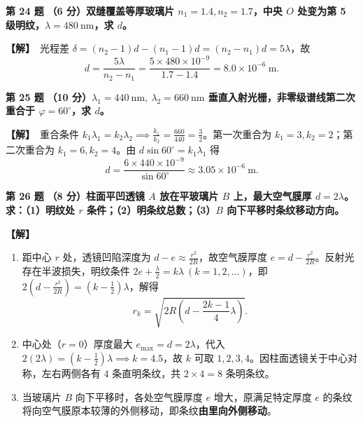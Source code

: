 \documentclass[zihao=5,a4paper,UTF8]{ctexart}
\newenvironment{prob}[2]{%
    \par\vspace{5pt}\noindent\textbf{\color{navy}#1} \textbf{#2}\par\nopagebreak\vspace{2pt}%
}{%
    \par\vspace{3pt}%
}
\newcommand{\sol}{\noindent\textbf{\color{tealaccent}【解】}\ }
\begin{document}
\begin{prob}{第 24 题}{（6 分）双缝覆盖等厚玻璃片 $n_1=1.4, n_2=1.7$，中央 $O$ 处变为第 5 级明纹，$\lambda=480\ \mathrm{nm}$，求 $d$。}
\sol 光程差 $\delta = (n_2 - 1)d - (n_1 - 1)d = (n_2 - n_1)d = 5\lambda$，故
\[
    d = \frac{5\lambda}{n_2 - n_1} = \frac{5\times 480\times 10^{-9}}{1.7 - 1.4} = 8.0\times 10^{-6}\ \mathrm{m}.
\]
\end{prob}

\begin{prob}{第 25 题}{（10 分）$\lambda_1=440\ \mathrm{nm},\ \lambda_2=660\ \mathrm{nm}$ 垂直入射光栅，非零级谱线第二次重合于 $\varphi=60^\circ$，求 $d$。}
\sol 重合条件 $k_1\lambda_1 = k_2\lambda_2 \implies \frac{k_1}{k_2} = \frac{660}{440} = \frac{3}{2}$。第一次重合为 $k_1=3, k_2=2$；第二次重合为 $k_1=6, k_2=4$。由 $d\sin 60^\circ = k_1\lambda_1$ 得
\[
    d = \frac{6\times 440\times 10^{-9}}{\sin 60^\circ} \approx 3.05\times 10^{-6}\ \mathrm{m}.
\]
\end{prob}

\begin{prob}{第 26 题}{（8 分）柱面平凹透镜 $A$ 放在平玻璃片 $B$ 上，最大空气膜厚 $d = 2\lambda$。求：（1）明纹处 $r$ 条件；（2）明条纹总数；（3）$B$ 向下平移时条纹移动方向。}
\sol
\begin{enumerate}[leftmargin=2em, itemsep=2pt]
    \item 距中心 $r$ 处，透镜凹陷深度为 $d - e \approx \frac{r^2}{2R}$，故空气膜厚度 $e = d - \frac{r^2}{2R}$。反射光存在半波损失，明纹条件 $2e + \frac{\lambda}{2} = k\lambda\ (k=1,2,\dots)$，即 $2\left(d - \frac{r^2}{2R}\right) = \left(k - \frac{1}{2}\right)\lambda$，解得
    \[
        r_k = \sqrt{2R\left(d - \frac{2k-1}{4}\lambda\right)}.
    \]
    \item 中心处（$r=0$）厚度最大 $e_{\max} = d = 2\lambda$，代入 $2(2\lambda) = (k - \frac{1}{2})\lambda \implies k = 4.5$，故 $k$ 可取 $1, 2, 3, 4$。因柱面透镜关于中心对称，左右两侧各有 $4$ 条直明条纹，共 $2\times 4 = 8$ 条明条纹。
    \item 当玻璃片 $B$ 向下平移时，各处空气膜厚度 $e$ 增大，原满足特定厚度 $e$ 的条纹将向空气膜原本较薄的外侧移动，即条纹\textbf{由里向外侧移动}。
\end{enumerate}
\end{prob}

\end{document}
